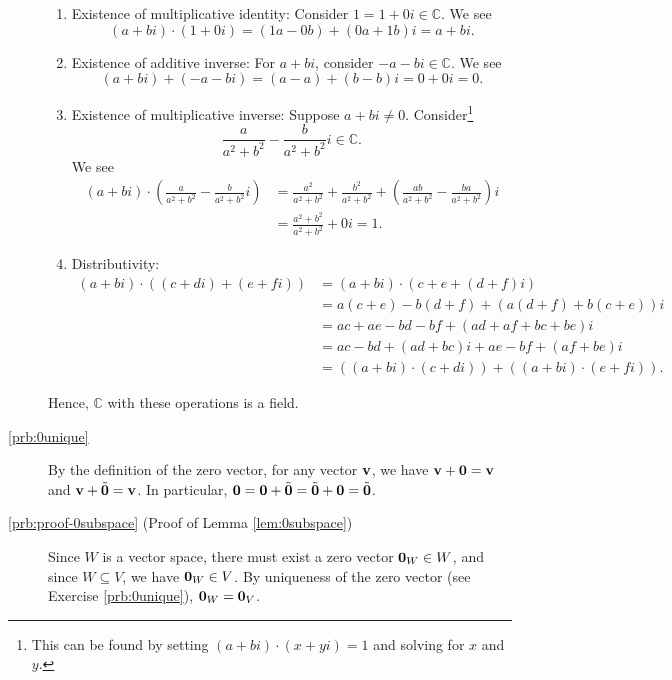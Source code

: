 \begin{description}
\begin{enumerate}
    \item Existence of multiplicative identity: Consider $ 1=1+0i\in\mathbb{C} $. We see
    \begin{equation*}
        (a+bi)\cdot(1+0i)=(1a-0b)+(0a+1b)i=a+bi.
    \end{equation*}

    \item Existence of additive inverse: For $ a+bi $, consider $ -a-bi\in\mathbb{C} $. We see
    \begin{equation*}
        (a+bi)+(-a-bi)=(a-a)+(b-b)i=0+0i=0.
    \end{equation*}

    \item Existence of multiplicative inverse: Suppose $ a+bi\neq 0 $. Consider\footnote{This can be found by setting $ (a+bi)\cdot(x+y i)=1 $ and solving for $ x $ and $ y $.}
    \begin{equation*}
        \frac{a}{a^2+b^2}-\frac{b}{a^2+b^2}i\in\mathbb{C}.
    \end{equation*}
    We see
    \begin{align*}
        (a+bi)\cdot\left(\frac{a}{a^2+b^2}-\frac{b}{a^2+b^2}i\right) &= \frac{a^2}{a^2+b^2}+\frac{b^2}{a^2+b^2}+\left(\frac{ab}{a^2+b^2}-\frac{ba}{a^2+b^2}\right)i \\
        &= \frac{a^2+b^2}{a^2+b^2}+0i=1.
    \end{align*}

    \item Distributivity:
    \begin{align*}
        (a+bi)\cdot((c+di)+(e+fi)) &= (a+bi)\cdot(c+e+(d+f)i) \\
        &= a(c+e)-b(d+f)+(a(d+f)+b(c+e))i \\
        &= ac+ae-bd-bf+(ad+af+bc+be)i \\
        &= ac-bd+(ad+bc)i+ae-bf+(af+be)i \\
        &= ((a+bi)\cdot(c+di))+((a+bi)\cdot(e+fi)).
    \end{align*}
\end{enumerate}
Hence, $ \mathbb{C} $ with these operations is a field.

\item[\ref{prb:0unique}] By the definition of the zero vector, for any vector $ \mathbf{v} $, we have $ \mathbf{v}+\mathbf{0}=\mathbf{v} $ and $ \mathbf{v}+\tilde{\mathbf{0}}=\mathbf{v} $. In particular, $ \mathbf{0}=\mathbf{0}+\tilde{\mathbf{0}}=\tilde{\mathbf{0}}+\mathbf{0}=\tilde{\mathbf{0}} $.

\item[\ref{prb:proof-0subspace} (Proof of Lemma \ref{lem:0subspace})] Since $ W $ is a vector space, there must exist a zero vector $ \mathbf{0}_W\in W $, and since $ W\subseteq V $, we have $ \mathbf{0}_W\in V $. By uniqueness of the zero vector (see Exercise \ref{prb:0unique}), $ \mathbf{0}_W=\mathbf{0}_V $.


\end{description}
